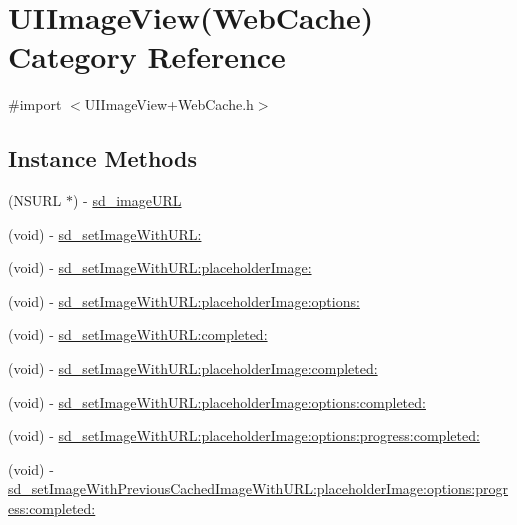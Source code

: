\hypertarget{category_u_i_image_view_07_web_cache_08}{}\section{U\+I\+Image\+View(Web\+Cache) Category Reference}
\label{category_u_i_image_view_07_web_cache_08}


{\ttfamily \#import $<$U\+I\+Image\+View+\+Web\+Cache.\+h$>$}

\subsection*{Instance Methods}
\begin{DoxyCompactItemize}
\item 
(N\+S\+U\+RL $\ast$) -\/ \mbox{\hyperlink{category_u_i_image_view_07_web_cache_08_abf2a037e36bc88eb9deeddbccd160755}{sd\+\_\+image\+U\+RL}}
\item 
(void) -\/ \mbox{\hyperlink{category_u_i_image_view_07_web_cache_08_a577e2abff6711b6eb793b6cd19f11dd3}{sd\+\_\+set\+Image\+With\+U\+R\+L\+:}}
\item 
(void) -\/ \mbox{\hyperlink{category_u_i_image_view_07_web_cache_08_a82e4106ff7460eff97dae9b79a539c41}{sd\+\_\+set\+Image\+With\+U\+R\+L\+:placeholder\+Image\+:}}
\item 
(void) -\/ \mbox{\hyperlink{category_u_i_image_view_07_web_cache_08_a4cc2a8f682e124d3df6495f74439a2cf}{sd\+\_\+set\+Image\+With\+U\+R\+L\+:placeholder\+Image\+:options\+:}}
\item 
(void) -\/ \mbox{\hyperlink{category_u_i_image_view_07_web_cache_08_a237803264855201b0f1150409fcbd74d}{sd\+\_\+set\+Image\+With\+U\+R\+L\+:completed\+:}}
\item 
(void) -\/ \mbox{\hyperlink{category_u_i_image_view_07_web_cache_08_afa4e73d2ffe8ee7c60b870a6730b7afd}{sd\+\_\+set\+Image\+With\+U\+R\+L\+:placeholder\+Image\+:completed\+:}}
\item 
(void) -\/ \mbox{\hyperlink{category_u_i_image_view_07_web_cache_08_ad2cf9154e98f4afdbba63251e3f1d1e5}{sd\+\_\+set\+Image\+With\+U\+R\+L\+:placeholder\+Image\+:options\+:completed\+:}}
\item 
(void) -\/ \mbox{\hyperlink{category_u_i_image_view_07_web_cache_08_a05de992a3162a51f223a248ceaa60856}{sd\+\_\+set\+Image\+With\+U\+R\+L\+:placeholder\+Image\+:options\+:progress\+:completed\+:}}
\item 
(void) -\/ \mbox{\hyperlink{category_u_i_image_view_07_web_cache_08_a80c34aa94dae003b0f2fd61ddf85becf}{sd\+\_\+set\+Image\+With\+Previous\+Cached\+Image\+With\+U\+R\+L\+:placeholder\+Image\+:options\+:progress\+:completed\+:}}

\end{DoxyCompactItemize}
